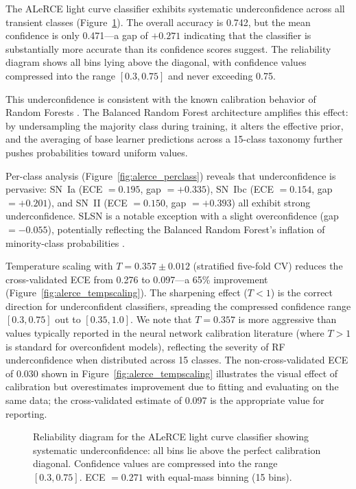 \documentclass[twocolumn]{aastex631}
\begin{document}
The ALeRCE light curve classifier exhibits systematic underconfidence across all transient classes (Figure~\ref{fig:alerce_reliability}). The overall accuracy is 0.742, but the mean confidence is only 0.471---a gap of $+0.271$ indicating that the classifier is substantially more accurate than its confidence scores suggest. The reliability diagram shows all bins lying above the diagonal, with confidence values compressed into the range $[0.3, 0.75]$ and never exceeding 0.75.

This underconfidence is consistent with the known calibration behavior of Random Forests \citep{niculescumizil2005, bostrom2008}. The Balanced Random Forest architecture amplifies this effect: by undersampling the majority class during training, it alters the effective prior, and the averaging of base learner predictions across a 15-class taxonomy further pushes probabilities toward uniform values.

Per-class analysis (Figure~\ref{fig:alerce_perclass}) reveals that underconfidence is pervasive: SN~Ia (ECE $= 0.195$, gap $= +0.335$), SN~Ibc (ECE $= 0.154$, gap $= +0.201$), and SN~II (ECE $= 0.150$, gap $= +0.393$) all exhibit strong underconfidence. SLSN is a notable exception with a slight overconfidence (gap $= -0.055$), potentially reflecting the Balanced Random Forest's inflation of minority-class probabilities \citep{vandengoorbergh2022}.

Temperature scaling with $T = 0.357 \pm 0.012$ (stratified five-fold CV) reduces the cross-validated ECE from 0.276 to 0.097---a 65\% improvement (Figure~\ref{fig:alerce_tempscaling}). The sharpening effect ($T < 1$) is the correct direction for underconfident classifiers, spreading the compressed confidence range $[0.3, 0.75]$ out to $[0.35, 1.0]$. We note that $T = 0.357$ is more aggressive than values typically reported in the neural network calibration literature (where $T > 1$ is standard for overconfident models), reflecting the severity of RF underconfidence when distributed across 15 classes. The non-cross-validated ECE of 0.030 shown in Figure~\ref{fig:alerce_tempscaling} illustrates the visual effect of calibration but overestimates improvement due to fitting and evaluating on the same data; the cross-validated estimate of 0.097 is the appropriate value for reporting.

\begin{figure}
\caption{Reliability diagram for the ALeRCE light curve classifier showing systematic underconfidence: all bins lie above the perfect calibration diagonal. Confidence values are compressed into the range $[0.3, 0.75]$. ECE $= 0.271$ with equal-mass binning (15 bins). \label{fig:alerce_reliability}}
\end{figure}
\end{document}
